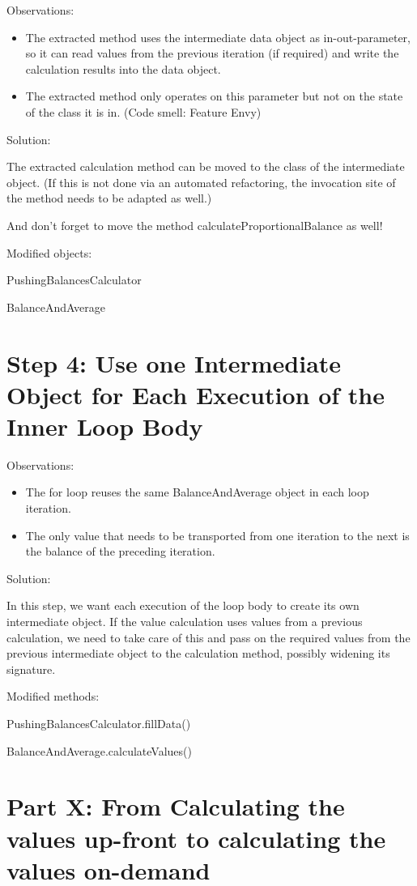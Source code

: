\documentclass[a4paper,fleqn,titlepage,11pt]{article}
\begin{document}
Observations:
\begin{itemize}
\item The extracted method uses the intermediate data object as in-out-parameter, so it can read values from the previous iteration (if required) and write the calculation results into the data object.
\item The extracted method only operates on this parameter but not on the state of the class it is in. (Code smell: Feature Envy)
\end{itemize}

Solution:

The extracted calculation method can be moved to the class of the intermediate object. (If this is not done via an automated refactoring, the invocation site of the method needs to be adapted as well.)

And don't forget to move the method calculateProportionalBalance as well!

Modified objects:

PushingBalancesCalculator

BalanceAndAverage


\section{Step 4: Use one Intermediate Object for Each Execution of the Inner Loop Body}

Observations:
\begin{itemize}
\item The for loop reuses the same BalanceAndAverage object in each loop iteration.
\item The only value that needs to be transported from one iteration to the next is the balance of the preceding iteration.
\end{itemize}

Solution:

In this step, we want each execution of the loop body to create its own intermediate object. If the value calculation uses values from a previous calculation, we need to take care of this and pass on the required values from the previous intermediate object to the calculation method, possibly widening its signature.

Modified methods:

PushingBalancesCalculator.fillData()

BalanceAndAverage.calculateValues()

\section{Part X: From Calculating the values up-front to calculating the values on-demand}
\end{document}
